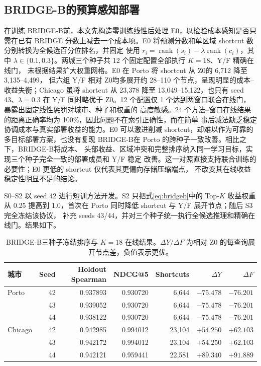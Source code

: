 \documentclass[UTF8,a4paper,10pt,twocolumn]{ctexart}
\newenvironment{paperwidetable}{\begin{table}[t]}{\end{table}}
\newenvironment{paperwidetable}{\begin{table}[H]}{\end{table}}
\newcommand{\zmethod}{Z0}
\newcommand{\gmethod}{BRIDGE}
\newcommand{\bmethod}{BRIDGE-B}
\begin{document}
\subsection{\bmethod 的预算感知部署}

在训练 \bmethod 前，本文先构造零训练线性后处理 E0，以检验成本感知是否只需在已有 \gmethod
分数上减去一个成本项。E0 将预测分数和单区域 shortcut 数分别转换为全候选百分位排名，并固定
使用 $r_i=\operatorname{rank}(s_i)-\lambda\operatorname{rank}(c_i)$，其中
$\lambda\in\{0.1,0.3\}$。两城三个种子共 12 个固定配置全部执行 $K=18$、Y/F 精确在线门，
未根据结果扩大权重网格。E0 在 Porto 将 shortcut 从 \zmethod 的 6,712 降至 3,135--4,499，
但六组 Y/F 相对 \zmethod 均多展开约 28--110 个节点，呈现明显的成本--收益失衡；Chicago 虽将
shortcut 从 23,378 降至 13,049--15,122，也只有 seed 43、$\lambda=0.3$ 在 Y/F 同时略优于
\zmethod。12 个配置仅 1 个达到两窗口联合在线门，暴露出固定线性惩罚对城市、种子和权重的
高度敏感。24 个方法--窗口在线结果的距离正确率均为 100\%，因此问题不在索引正确性，而在简单
事后减法缺乏稳定协调成本与真实部署收益的能力。E0 可以激进削减 shortcut，却难以作为可靠的
多目标部署方案，也没有复现 \bmethod 在 Porto 的跨种子一致改善。相比之下，\bmethod 将成本、
头部收益、区域冲突和完整排序纳入同一学习目标，实现三个种子完全一致的部署成员和 Y/F 稳定
改善。这一对照直接支持联合训练的必要性；E0 更低的 shortcut 仅代表其更偏向存储压缩端点，
不改变其在线收益稳定性明显不足的结论。

S0--S2 以 seed 42 进行短训方法开发。S2 只把式\eqref{eq:bridgeb}中的 Top-$K$ 收益权重从
0.25 提高到 1.0，首次在 Porto 同时降低 shortcut 与 Y/F 展开节点；随后 S3 完全冻结该协议，
补充 seeds 43/44，并对三个种子统一执行全候选推理和精确在线门。结果如下。

\begin{paperwidetable}
  \centering
  \footnotesize
  \caption{\bmethod 三种子冻结排序与 $K=18$ 在线结果。$\Delta Y/\Delta F$ 为相对 \zmethod
  的每查询展开节点差，负值表示更优。}
  \label{tab:bridgeb}
  \begin{tabular}{lrrrrrr}
    \toprule
    城市 & Seed & Holdout Spearman & NDCG@5 & Shortcuts & $\Delta Y$ & $\Delta F$ \\
    \midrule
    Porto & 42 & 0.937893 & 0.930720 & 6,644 & $\mathbf{-75.478}$ & $\mathbf{-76.201}$ \\
          & 43 & 0.939052 & 0.930720 & 6,644 & $\mathbf{-75.478}$ & $\mathbf{-76.201}$ \\
          & 44 & 0.938122 & 0.930720 & 6,644 & $\mathbf{-75.478}$ & $\mathbf{-76.201}$ \\
    \midrule
    Chicago & 42 & 0.942985 & 0.994012 & 23,104 & $+54.250$ & $+62.103$ \\
            & 43 & 0.942172 & 0.994012 & 23,104 & $+54.250$ & $+62.103$ \\
            & 44 & 0.942121 & 0.959441 & 22,581 & $+89.340$ & $+91.889$ \\
    \bottomrule
  \end{tabular}
\end{paperwidetable}
\end{document}
